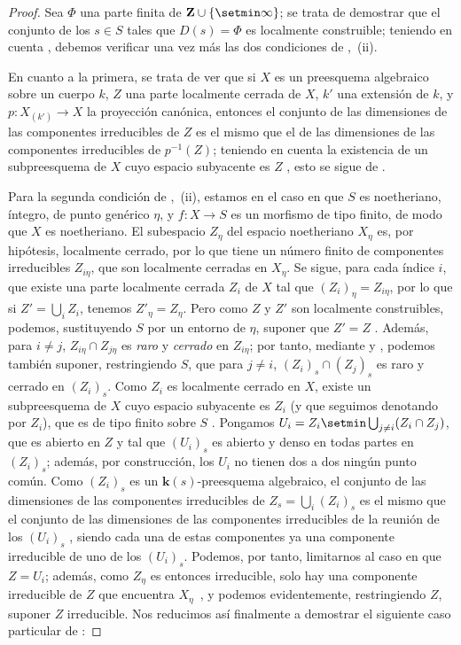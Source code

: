 \begin{proof}
Sea $\Phi$ una parte finita de $\mathbf{Z}\cup\{\setmin\infty\}$; se trata de demostrar que el conjunto de los $s\in S$ tales que $D(s)=\Phi$ es localmente construible; teniendo en cuenta , debemos verificar una vez más las dos condiciones de ,~(ii).

En cuanto a la primera, se trata de ver que si $X$ es un preesquema algebraico sobre un cuerpo $k$, $Z$ una parte localmente cerrada de $X$, $k'$ una extensión de $k$, y $p:X_{(k')}\to X$ la proyección canónica, entonces el conjunto de las dimensiones de las componentes irreducibles de $Z$ es el mismo que el de las dimensiones de las componentes irreducibles de $p^{-1}(Z)$; teniendo en cuenta la existencia de un subpreesquema de $X$ cuyo espacio subyacente es $Z$ , esto se sigue de .

Para la segunda condición de ,~(ii), estamos en el caso en que $S$ es noetheriano, íntegro, de punto genérico $\eta$, y $f:X\to S$ es un morfismo de tipo finito, de modo que $X$ es noetheriano.
El subespacio $Z_\eta$ del espacio noetheriano $X_\eta$ es, por hipótesis, localmente cerrado, por lo que tiene un número finito de componentes irreducibles $Z_{i\eta}$, que son localmente cerradas en $X_\eta$.
Se sigue, para cada índice $i$, que existe una parte localmente cerrada $Z_i$ de $X$ tal que $(Z_i)_\eta=Z_{i\eta}$, por lo que si $Z'=\bigcup_i Z_i$, tenemos $Z'_\eta=Z_\eta$.
Pero como $Z$ y $Z'$ son localmente construibles, podemos, sustituyendo $S$ por un entorno de $\eta$, suponer que $Z'=Z$ .
Además, para $i\neq j$, $Z_{i\eta}\cap Z_{j\eta}$ es \emph{raro} y \emph{cerrado} en $Z_{i\eta}$; por tanto, mediante  y , podemos también suponer, restringiendo $S$, que para $j\neq i$, $(Z_i)_s\cap(Z_j)_s$ es raro y cerrado en $(Z_i)_s$.
Como $Z_i$ es localmente cerrado en $X$, existe un subpreesquema de $X$ cuyo espacio subyacente es $Z_i$ (y que seguimos denotando por $Z_i$), que es de tipo finito sobre $S$ .
Pongamos $U_i=Z_i\setmin\bigcup_{j\neq i}(Z_i\cap Z_j)$, que es abierto en $Z$ y tal que $(U_i)_s$ es abierto y denso en todas partes en $(Z_i)_s$; además, por construcción, los $U_i$ no tienen dos a dos ningún punto común.
Como $(Z_i)_s$ es un $\boldsymbol{k}(s)$-preesquema algebraico, el conjunto de las dimensiones de las componentes irreducibles de $Z_s=\bigcup_i(Z_i)_s$ es el mismo que el conjunto de las dimensiones de las componentes irreducibles de la reunión de los $(U_i)_s$ , siendo cada una de estas componentes ya una componente irreducible de uno de los $(U_i)_s$.
Podemos, por tanto, limitarnos al caso en que $Z=U_i$; además, como $Z_\eta$ es entonces irreducible, solo hay una componente irreducible de $Z$ que encuentra $X_\eta$~, y podemos evidentemente, restringiendo $Z$, suponer $Z$ irreducible.
Nos reducimos así finalmente a demostrar el siguiente caso particular de :
\end{proof}

